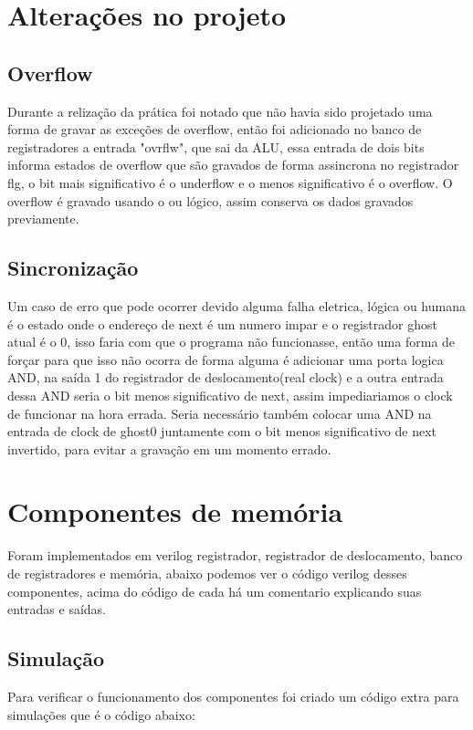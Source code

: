 \documentclass[a4paper, 10pt]{article}
\begin{document}
\section{Alterações no projeto}
\subsection{Overflow}
Durante a relização da prática foi notado que não havia sido projetado uma forma de gravar as exceções de overflow, então foi adicionado no banco de registradores a entrada "ovrflw", que sai da ALU, essa entrada de dois bits informa estados de overflow que são gravados de forma assincrona no registrador flg, o bit mais significativo é o underflow e o menos significativo é o overflow. O overflow é gravado usando o ou lógico, assim conserva os dados gravados previamente.
\subsection{Sincronização}
Um caso de erro que pode ocorrer devido alguma falha eletrica, lógica ou humana é o estado onde o endereço de next é um numero impar e o registrador ghost atual é o 0, isso faria com que o programa não funcionasse, então uma forma de forçar para que isso não ocorra de forma alguma é adicionar uma porta logica AND, na saída 1 do registrador de deslocamento(real clock) e a outra entrada dessa AND seria o bit menos significativo de next, assim impediariamos o clock de funcionar na hora errada. Seria necessário também colocar uma AND na entrada de clock de ghost0 juntamente com o bit menos significativo de next invertido, para evitar a gravação em um momento errado.
\section{Componentes de memória}
Foram implementados em verilog registrador, registrador de deslocamento, banco de registradores e memória, abaixo podemos ver o código verilog desses componentes, acima do código de cada há um comentario explicando suas entradas e saídas.

\subsection{Simulação}
Para verificar o funcionamento dos componentes foi criado um código extra para simulações que é o código abaixo:

\end{document}
